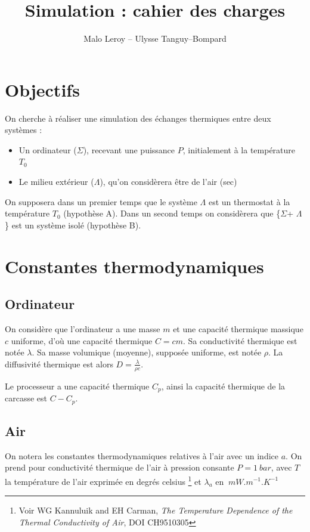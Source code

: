 \documentclass{article}
\title{Simulation : cahier des charges}
\author{Malo Leroy -- Ulysse Tanguy--Bompard}
\newcommand{\air}{$\Lambda$\xspace}
\newcommand{\ordi}{$\Sigma$\xspace}
\begin{document}
\maketitle

\section{Objectifs}

On cherche à réaliser une simulation des échanges thermiques entre deux systèmes :
\begin{itemize}
    \item Un ordinateur (\ordi), recevant une puissance $P$, initialement à la température $T_0$
    \item Le milieu extérieur (\air), qu'on considèrera être de l'air (sec)
\end{itemize}

On supposera dans un premier temps que le système \air est un thermostat à la température $T_0$ (hypothèse A). Dans un second temps on considèrera que \{\ordi + $\Lambda$\} est un système isolé (hypothèse B).

\section{Constantes thermodynamiques}

\subsection{Ordinateur}

On considère que l'ordinateur a une masse $m$ et une capacité thermique massique $c$ uniforme, d'où une capacité thermique $C = c m$. Sa conductivité thermique est notée $\lambda$. Sa masse volumique (moyenne), supposée uniforme, est notée $\rho$. La diffusivité thermique est alors $D = \frac{\lambda} {\rho c}$.

Le processeur a une capacité thermique $C_p$, ainsi la capacité thermique de la carcasse est $C - C_p$.

\subsection{Air}

On notera les constantes thermodynamiques relatives à l'air avec un indice $a$. On prend pour conductivité thermique de l'air à pression consante $P = \SI{1}{bar}$, avec $T$ la température de l'air exprimée en degrés celsius \footnote{Voir  WG Kannuluik and EH Carman, \textit{The Temperature Dependence of the Thermal Conductivity of Air}, DOI CH9510305} et $\lambda_{a}$ en $\SI{}{mW.m^{-1}.K^{-1}}$
\end{document}
